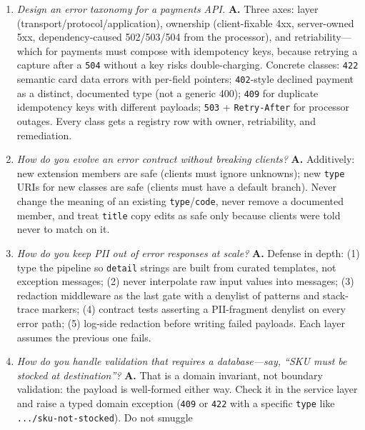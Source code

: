 \begin{enumerate}[label=\textbf{Q\arabic*.}, leftmargin=3.2em, start=18]
  \item \emph{Design an error taxonomy for a payments API.} \textbf{A.}
        Three axes: layer (transport/protocol/application), ownership
        (client-fixable 4xx, server-owned 5xx, dependency-caused
        502/503/504 from the processor), and retriability---which for
        payments must compose with idempotency keys, because retrying a
        capture after a \texttt{504} without a key risks double-charging.
        Concrete classes: \texttt{422} semantic card data errors with
        per-field pointers; \texttt{402}-style declined payment as a
        distinct, documented type (not a generic 400); \texttt{409} for
        duplicate idempotency keys with different payloads; \texttt{503} +
        \texttt{Retry-After} for processor outages. Every class gets a
        registry row with owner, retriability, and remediation.
  \item \emph{How do you evolve an error contract without breaking
        clients?} \textbf{A.} Additively: new extension members are safe
        (clients must ignore unknowns); new \texttt{type} URIs for new
        classes are safe (clients must have a default branch). Never change
        the meaning of an existing \texttt{type}/\texttt{code}, never remove
        a documented member, and treat \texttt{title} copy edits as safe
        only because clients were told never to match on it.
  \item \emph{How do you keep PII out of error responses at scale?}
        \textbf{A.} Defense in depth: (1) type the pipeline so
        \texttt{detail} strings are built from curated templates, not
        exception messages; (2) never interpolate raw input values into
        messages; (3) redaction middleware as the last gate with a denylist
        of patterns and stack-trace markers; (4) contract tests asserting a
        PII-fragment denylist on every error path; (5) log-side redaction
        before writing failed payloads. Each layer assumes the previous one
        fails.
  \item \emph{How do you handle validation that requires a database---say,
        ``SKU must be stocked at destination''?} \textbf{A.} That is a
        domain invariant, not boundary validation: the payload is
        well-formed either way. Check it in the service layer and raise a
        typed domain exception (\texttt{409} or \texttt{422} with a specific
        \texttt{type} like \texttt{.../sku-not-stocked}). Do not smuggle

\end{enumerate}
